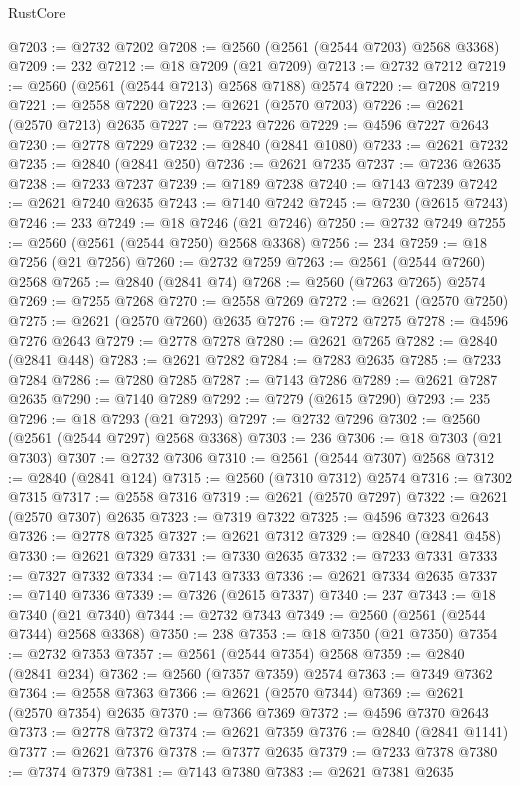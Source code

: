 \begin{lexlean}{RustCore}
\begin{coremodule}
@7203 := @2732 @7202
@7208 := @2560 (@2561 (@2544 @7203) @2568 @3368)
@7209 := 232
@7212 := @18 @7209 (@21 @7209)
@7213 := @2732 @7212
@7219 := @2560 (@2561 (@2544 @7213) @2568 @7188) @2574
@7220 := @7208 @7219
@7221 := @2558 @7220
@7223 := @2621 (@2570 @7203)
@7226 := @2621 (@2570 @7213) @2635
@7227 := @7223 @7226
@7229 := @4596 @7227 @2643
@7230 := @2778 @7229
@7232 := @2840 (@2841 @1080)
@7233 := @2621 @7232
@7235 := @2840 (@2841 @250)
@7236 := @2621 @7235
@7237 := @7236 @2635
@7238 := @7233 @7237
@7239 := @7189 @7238
@7240 := @7143 @7239
@7242 := @2621 @7240 @2635
@7243 := @7140 @7242
@7245 := @7230 (@2615 @7243)
@7246 := 233
@7249 := @18 @7246 (@21 @7246)
@7250 := @2732 @7249
@7255 := @2560 (@2561 (@2544 @7250) @2568 @3368)
@7256 := 234
@7259 := @18 @7256 (@21 @7256)
@7260 := @2732 @7259
@7263 := @2561 (@2544 @7260) @2568
@7265 := @2840 (@2841 @74)
@7268 := @2560 (@7263 @7265) @2574
@7269 := @7255 @7268
@7270 := @2558 @7269
@7272 := @2621 (@2570 @7250)
@7275 := @2621 (@2570 @7260) @2635
@7276 := @7272 @7275
@7278 := @4596 @7276 @2643
@7279 := @2778 @7278
@7280 := @2621 @7265
@7282 := @2840 (@2841 @448)
@7283 := @2621 @7282
@7284 := @7283 @2635
@7285 := @7233 @7284
@7286 := @7280 @7285
@7287 := @7143 @7286
@7289 := @2621 @7287 @2635
@7290 := @7140 @7289
@7292 := @7279 (@2615 @7290)
@7293 := 235
@7296 := @18 @7293 (@21 @7293)
@7297 := @2732 @7296
@7302 := @2560 (@2561 (@2544 @7297) @2568 @3368)
@7303 := 236
@7306 := @18 @7303 (@21 @7303)
@7307 := @2732 @7306
@7310 := @2561 (@2544 @7307) @2568
@7312 := @2840 (@2841 @124)
@7315 := @2560 (@7310 @7312) @2574
@7316 := @7302 @7315
@7317 := @2558 @7316
@7319 := @2621 (@2570 @7297)
@7322 := @2621 (@2570 @7307) @2635
@7323 := @7319 @7322
@7325 := @4596 @7323 @2643
@7326 := @2778 @7325
@7327 := @2621 @7312
@7329 := @2840 (@2841 @458)
@7330 := @2621 @7329
@7331 := @7330 @2635
@7332 := @7233 @7331
@7333 := @7327 @7332
@7334 := @7143 @7333
@7336 := @2621 @7334 @2635
@7337 := @7140 @7336
@7339 := @7326 (@2615 @7337)
@7340 := 237
@7343 := @18 @7340 (@21 @7340)
@7344 := @2732 @7343
@7349 := @2560 (@2561 (@2544 @7344) @2568 @3368)
@7350 := 238
@7353 := @18 @7350 (@21 @7350)
@7354 := @2732 @7353
@7357 := @2561 (@2544 @7354) @2568
@7359 := @2840 (@2841 @234)
@7362 := @2560 (@7357 @7359) @2574
@7363 := @7349 @7362
@7364 := @2558 @7363
@7366 := @2621 (@2570 @7344)
@7369 := @2621 (@2570 @7354) @2635
@7370 := @7366 @7369
@7372 := @4596 @7370 @2643
@7373 := @2778 @7372
@7374 := @2621 @7359
@7376 := @2840 (@2841 @1141)
@7377 := @2621 @7376
@7378 := @7377 @2635
@7379 := @7233 @7378
@7380 := @7374 @7379
@7381 := @7143 @7380
@7383 := @2621 @7381 @2635

\end{coremodule}
\end{lexlean}
